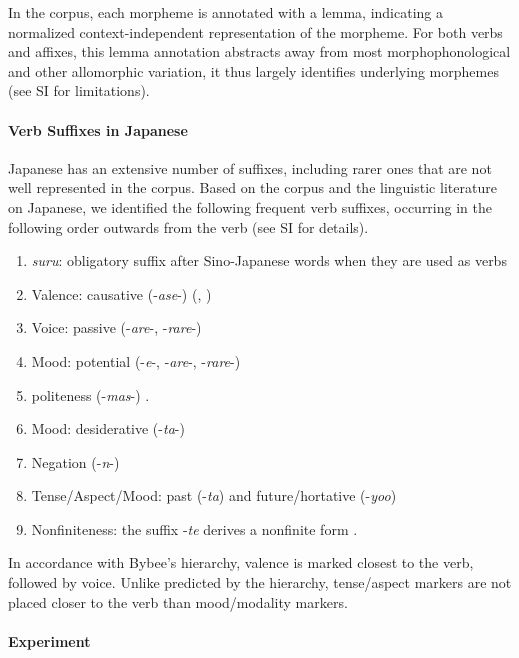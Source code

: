 In the corpus, each morpheme is annotated with a lemma, indicating a normalized context-independent representation of the morpheme.
For both verbs and affixes, this lemma annotation abstracts away from most morphophonological and other allomorphic variation, it thus largely identifies underlying morphemes (see SI for limitations).


\paragraph{Verb Suffixes in Japanese}

Japanese has an extensive number of suffixes, including rarer ones that are not well represented in the corpus.
Based on the corpus and the linguistic literature on Japanese, we identified the following frequent verb suffixes, occurring in the following order outwards from the verb (see SI for details).


\begin{enumerate}
\item \textit{suru}: obligatory suffix after Sino-Japanese words when they are used as verbs
\item Valence: causative (-\textit{ase}-) (\citet[142]{hasegawa2014japanese}, \citet[Chapter 13]{kaiser2013japanese})
\item Voice: passive (-\textit{are}-, -\textit{rare}-) \cite[152]{hasegawa2014japanese} \cite[Chapter 12]{kaiser2013japanese}
\item Mood: potential (-\textit{e}-, -\textit{are}-, -\textit{rare}-)  
\item politeness (-\textit{mas}-) \cite[190]{kaiser2013japanese}.
\item Mood: desiderative (-\textit{ta}-) \cite[238]{kaiser2013japanese}
\item Negation (-\textit{n}-)
\item Tense/Aspect/Mood: past (-\textit{ta}) and future/hortative (-\textit{yoo}) \cite[229]{kaiser2013japanese}
\item Nonfiniteness: the suffix -\textit{te} derives a nonfinite form \cite[186]{kaiser2013japanese}.
\end{enumerate}

In accordance with Bybee's hierarchy, valence is marked closest to the verb, followed by voice.
Unlike predicted by the hierarchy, tense/aspect markers are not placed closer to the verb than mood/modality markers.



\paragraph{Experiment}

